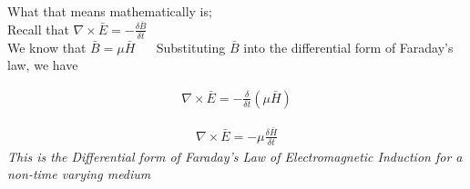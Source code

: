 What that means mathematically is;\\
Recall that $\nabla \times \bar{E} = - \frac{\delta\bar{B}}{\delta t}$\\
We know that $\bar{B} = \mu \bar{H}$ $\quad$ Substituting $\bar{B}$ into the differential form of Faraday's law, we have	

\begin{align*}
\nabla \times \bar{E} = - \frac{\delta}{\delta t} (\mu\bar{H})
\end{align*}

\begin{align}	 
\nabla \times \bar{E} = -\mu\frac{\delta \bar{H}}{\delta t}
\end{align}
\emph{This is the Differential form of Faraday's Law of Electromagnetic Induction for a non-time varying medium}

